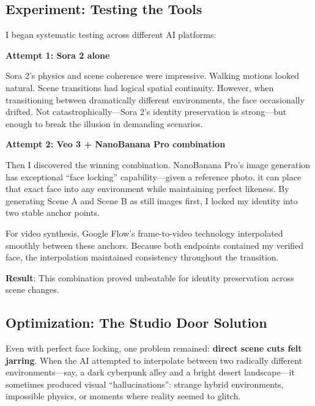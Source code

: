 \subsection{Experiment: Testing the Tools}

I began systematic testing across different AI platforms:

\textbf{Attempt 1: Sora 2 alone}

Sora 2's physics and scene coherence were impressive. Walking motions looked natural. Scene transitions had logical spatial continuity. However, when transitioning between dramatically different environments, the face occasionally drifted. Not catastrophically—Sora 2's identity preservation is strong—but enough to break the illusion in demanding scenarios.

\textbf{Attempt 2: Veo 3 + NanoBanana Pro combination}

Then I discovered the winning combination. NanoBanana Pro's image generation has exceptional ``face locking'' capability—given a reference photo, it can place that exact face into any environment while maintaining perfect likeness. By generating Scene A and Scene B as still images first, I locked my identity into two stable anchor points.

For video synthesis, Google Flow's frame-to-video technology interpolated smoothly between these anchors. Because both endpoints contained my verified face, the interpolation maintained consistency throughout the transition.

\textbf{Result}: This combination proved unbeatable for identity preservation across scene changes.

\subsection{Optimization: The Studio Door Solution}

Even with perfect face locking, one problem remained: \textbf{direct scene cuts felt jarring}. When the AI attempted to interpolate between two radically different environments—say, a dark cyberpunk alley and a bright desert landscape—it sometimes produced visual ``hallucinations'': strange hybrid environments, impossible physics, or moments where reality seemed to glitch.

